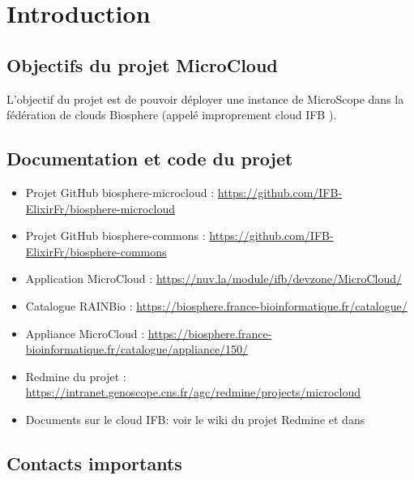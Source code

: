 \chapter{Introduction}

\section{Objectifs du projet MicroCloud}

L'objectif du projet est de pouvoir déployer une instance de MicroScope dans la fédération de clouds Biosphere (appelé improprement \og{} cloud IFB \fg{}).

\section{Documentation et code du projet}

\begin{itemize}
    \item Projet GitHub biosphere-microcloud : \url{https://github.com/IFB-ElixirFr/biosphere-microcloud}
    \item Projet GitHub biosphere-commons : \url{https://github.com/IFB-ElixirFr/biosphere-commons}
    \item Application MicroCloud : \url{https://nuv.la/module/ifb/devzone/MicroCloud/}
    \item Catalogue RAINBio : \url{https://biosphere.france-bioinformatique.fr/catalogue/}
    \item Appliance MicroCloud : \url{https://biosphere.france-bioinformatique.fr/catalogue/appliance/150/}
    \item Redmine du projet : \url{https://intranet.genoscope.cns.fr/agc/redmine/projects/microcloud} 
    \item Documents sur le cloud IFB: voir le wiki du projet Redmine et dans 
\end{itemize}

\section{Contacts importants}

